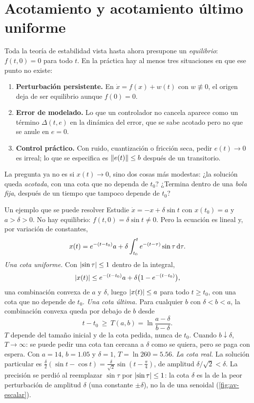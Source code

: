 \section{Acotamiento y acotamiento último uniforme}
\label{sec:av-uub}

Toda la teoría de estabilidad vista hasta ahora presupone un \emph{equilibrio}: $f(t,0)=0$ para todo $t$. En la práctica hay al menos tres situaciones en que ese punto no existe:
\begin{enumerate}
  \item \textbf{Perturbación persistente.} En $\dot x=f(x)+w(t)$ con $w\not\equiv0$, el origen deja de ser equilibrio aunque $f(0)=0$.
  \item \textbf{Error de modelado.} Lo que un controlador no cancela aparece como un término $\Delta(t,e)$ en la dinámica del error, que se sabe acotado pero no que se anule en $e=0$.
  \item \textbf{Control práctico.} Con ruido, cuantización o fricción seca, pedir $e(t)\to0$ es irreal; lo que se especifica es $\left\lVert e(t)\right\rVert\le b$ después de un transitorio.
\end{enumerate}
La pregunta ya no es si $x(t)\to0$, sino dos cosas más modestas: ¿la solución queda \emph{acotada}, con una cota que no dependa de $t_0$? ¿Termina dentro de una \emph{bola fija}, después de un tiempo que tampoco depende de $t_0$?

\begin{ejemplo}[label=ej:av-escalar]{Un ejemplo que se puede resolver}
Estudie $\dot x=-x+\delta\sin t$ con $x(t_0)=a$ y $a>\delta>0$.
\solucion No hay equilibrio: $f(t,0)=\delta\sin t\neq0$. Pero la ecuación es lineal y, por variación de constantes,
\[
  x(t)=e^{-(t-t_0)}a+\delta\int_{t_0}^te^{-(t-\tau)}\sin\tau\,\mathrm{d}\tau .
\]
\emph{Una cota uniforme.} Con $\left\lvert \sin\tau\right\rvert\le1$ dentro de la integral,
\[
  \left\lvert x(t)\right\rvert\le e^{-(t-t_0)}a+\delta\bigl(1-e^{-(t-t_0)}\bigr),
\]
una combinación convexa de $a$ y $\delta$, luego $\left\lvert x(t)\right\rvert\le a$ para todo $t\ge t_0$, con una cota que no depende de $t_0$.
\emph{Una cota última.} Para cualquier $b$ con $\delta<b<a$, la combinación convexa queda por debajo de $b$ desde
\[
  t-t_0\ \ge\ T(a,b)=\ln\frac{a-\delta}{b-\delta} .
\]
$T$ depende del tamaño inicial y de la cota pedida, nunca de $t_0$. Cuando $b\downarrow\delta$, $T\to\infty$: se puede pedir una cota tan cercana a $\delta$ como se quiera, pero se paga con espera. Con $a=14$, $b=1.05$ y $\delta=1$, $T=\ln260=5.56$.
\emph{La cota real.} La solución particular es $\frac\delta2(\sin t-\cos t)=\frac{\delta}{\sqrt2}\sin(t-\frac\pi4)$, de amplitud $\delta/\sqrt2<\delta$. La precisión se perdió al reemplazar $\sin\tau$ por $\left\lvert \sin\tau\right\rvert\le1$: la cota $\delta$ es la de la peor perturbación de amplitud $\delta$ (una constante $\pm\delta$), no la de una senoidal (\cref{fig:av-escalar}).
\end{ejemplo}


